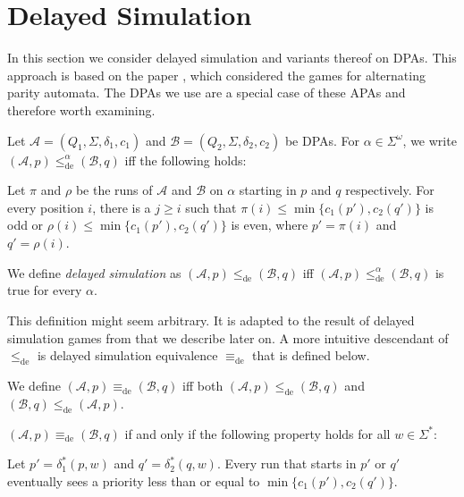 
\section{Delayed Simulation}
\label{sect:fritzwilke}
In this section we consider delayed simulation and variants thereof on DPAs. This approach is based on the paper \cite{FritzWilke06}, which considered the games for alternating parity automata. The DPAs we use are a special case of these APAs and therefore worth examining.

\begin{defn}
	Let $\mathcal{A} = (Q_1, \Sigma, \delta_1, c_1)$ and $\mathcal{B} = (Q_2, \Sigma, \delta_2, c_2)$ be DPAs. For $\alpha \in \Sigma^\omega$, we write $(\mathcal{A}, p) \leq_\text{de}^\alpha (\mathcal{B}, q)$ iff the following holds:
	
	Let $\pi$ and $\rho$ be the runs of $\mathcal{A}$ and $\mathcal{B}$ on $\alpha$ starting in $p$ and $q$ respectively. For every position $i$, there is a $j \geq i$ such that $\pi(i) \leq \min \{c_1(p'), c_2(q')\}$ is odd or $\rho(i) \leq \min \{c_1(p'), c_2(q')\}$ is even, where $p' = \pi(i)$ and $q' = \rho(i)$.
	
	We define \emph{delayed simulation} as $(\mathcal{A}, p) \leq_\text{de} (\mathcal{B}, q)$ iff $(\mathcal{A}, p) \leq_\text{de}^\alpha (\mathcal{B}, q)$ is true for every $\alpha$.
\end{defn}

This definition might seem arbitrary. It is adapted to the result of delayed simulation games from \cite{FritzWilke06} that we describe later on. A more intuitive descendant of $\leq_\text{de}$ is delayed simulation equivalence $\equiv_\text{de}$ that is defined below.

\begin{defn}
	We define $(\mathcal{A}, p) \equiv_\text{de} (\mathcal{B}, q)$ iff both $(\mathcal{A}, p) \leq_\text{de} (\mathcal{B}, q)$ and $(\mathcal{B}, q) \leq_\text{de} (\mathcal{A}, p)$.
\end{defn}

\begin{lem}
	\label{lem:fritzwilke:equivde_alternative}
	$(\mathcal{A}, p) \equiv_\text{de} (\mathcal{B}, q)$ if and only if the following property holds for all $w \in \Sigma^*$: 
	
	Let $p' = \delta_1^*(p, w)$ and $q' = \delta_2^*(q, w)$. Every run that starts in $p'$ or $q'$ eventually sees a priority less than or equal to $\min \{c_1(p'), c_2(q')\}$.
\end{lem}

